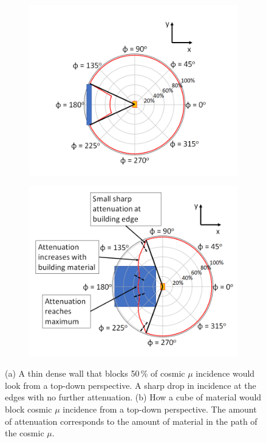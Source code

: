  \begin{figure}[!h]
\centering
\begin{subfigure}{.5\textwidth}
  \centering
  \includegraphics[width=\linewidth]{Chapter5/Figs/topDownWallPhiRedo.png}
  \captionsetup{width=.9\linewidth}
  \caption{}
  \label{subFig:TopDownCircularWallPlot}
\end{subfigure}%
\begin{subfigure}{.5\textwidth}
  \centering
\includegraphics[width=\linewidth]{Chapter5/Figs/topDownCubePhiRedo.png}
  \captionsetup{width=.9\linewidth}
  \caption{}
  \label{subFig:TopDownCircularCubePlot}
\end{subfigure}
\caption{(a) A thin dense wall that blocks 50\,\% of cosmic $\mu$ incidence would look from a top-down perspective. A sharp drop in incidence at the edges with no further attenuation. (b) How a cube of material would block cosmic $\mu$ incidence from a top-down perspective. The amount of attenuation corresponds to the amount of material in the path of the cosmic $\mu$.}
\label{fig:TopDownCircularWallCubePlot}
\end{figure}
 
